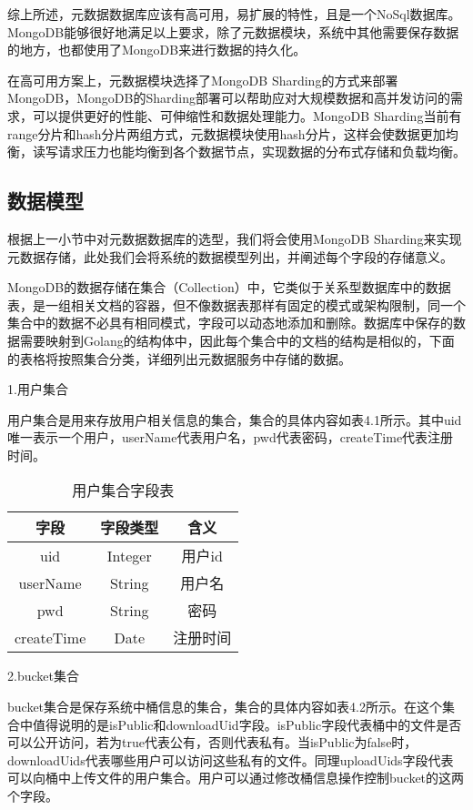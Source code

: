 综上所述，元数据数据库应该有高可用，易扩展的特性，且是一个NoSql数据库。MongoDB能够很好地满足以上要求，除了元数据模块，系统中其他需要保存数据的地方，也都使用了MongoDB来进行数据的持久化。

在高可用方案上，元数据模块选择了MongoDB Sharding的方式来部署MongoDB，MongoDB的Sharding部署可以帮助应对大规模数据和高并发访问的需求，可以提供更好的性能、可伸缩性和数据处理能力。MongoDB Sharding当前有range分片和hash分片两组方式，元数据模块使用hash分片，这样会使数据更加均衡，读写请求压力也能均衡到各个数据节点，实现数据的分布式存储和负载均衡。

\subsection{数据模型}
根据上一小节中对元数据数据库的选型，我们将会使用MongoDB Sharding来实现元数据存储，此处我们会将系统的数据模型列出，并阐述每个字段的存储意义。

MongoDB的数据存储在集合（Collection）中，它类似于关系型数据库中的数据表，是一组相关文档的容器，但不像数据表那样有固定的模式或架构限制，同一个集合中的数据不必具有相同模式，字段可以动态地添加和删除。数据库中保存的数据需要映射到Golang的结构体中，因此每个集合中的文档的结构是相似的，下面的表格将按照集合分类，详细列出元数据服务中存储的数据。

1.用户集合

用户集合是用来存放用户相关信息的集合，集合的具体内容如表4.1所示。其中uid唯一表示一个用户，userName代表用户名，pwd代表密码，createTime代表注册时间。

\begin{table}[h]
    \centering
    \caption{用户集合字段表}
    \begin{tabular}{ccc}
      \toprule
      字段       & 字段类型  & 含义       \\
      \midrule
      uid        & Integer  & 用户id         \\
      userName   & String   & 用户名  \\
      pwd        & String   & 密码  \\
      createTime & Date     & 注册时间  \\
      \bottomrule
    \end{tabular}
\end{table}


2.bucket集合

bucket集合是保存系统中桶信息的集合，集合的具体内容如表4.2所示。在这个集合中值得说明的是isPublic和downloadUid字段。isPublic字段代表桶中的文件是否可以公开访问，若为true代表公有，否则代表私有。当isPublic为false时，downloadUids代表哪些用户可以访问这些私有的文件。同理uploadUids字段代表可以向桶中上传文件的用户集合。用户可以通过修改桶信息操作控制bucket的这两个字段。

